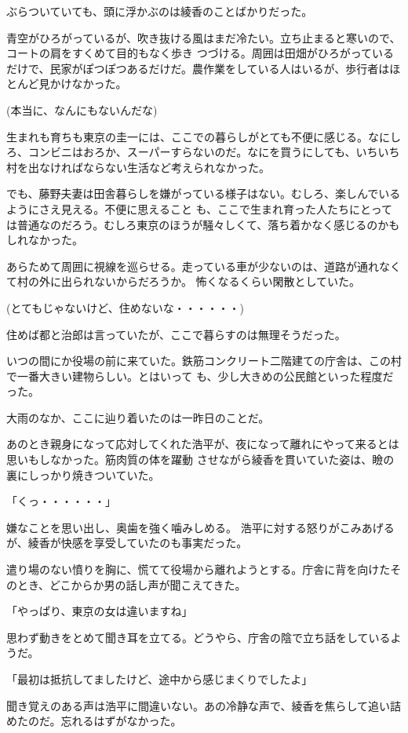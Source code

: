 ﻿\documentclass[book,tate]{jlreq}
\begin{document}
ぶらついていても、頭に浮かぶのは綾香のことばかりだった。

青空がひろがっているが、吹き抜ける風はまだ冷たい。立ち止まると寒いので、コートの肩をすくめて目的もなく歩き つづける。周囲は田畑がひろがっているだけで、民家がぽつぽつあるだけだ。農作業をしている人はいるが、歩行者はほ とんど見かけなかった。

(本当に、なんにもないんだな)

生まれも育ちも東京の圭一には、ここでの暮らしがとても不便に感じる。なにしろ、コンビニはおろか、スーパーすらないのだ。なにを買うにしても、いちいち村を出なければならない生活など考えられなかった。

でも、藤野夫妻は田舎暮らしを嫌がっている様子はない。むしろ、楽しんでいるようにさえ見える。不便に思えること も、ここで生まれ育った人たちにとっては普通なのだろう。むしろ東京のほうが騒々しくて、落ち着かなく感じるのかも しれなかった。

あらためて周囲に視線を巡らせる。走っている車が少ないのは、道路が通れなくて村の外に出られないからだろうか。 怖くなるくらい閑散としていた。

(とてもじゃないけど、住めないな・・・・・・)

住めば都と治郎は言っていたが、ここで暮らすのは無理そうだった。

いつの間にか役場の前に来ていた。鉄筋コンクリート二階建ての庁舎は、この村で一番大きい建物らしい。とはいって も、少し大きめの公民館といった程度だった。

大雨のなか、ここに辿り着いたのは一昨日のことだ。

あのとき親身になって応対してくれた浩平が、夜になって離れにやって来るとは思いもしなかった。筋肉質の体を躍動 させながら綾香を貫いていた姿は、瞼の裏にしっかり焼きついていた。

「くっ・・・・・・」

嫌なことを思い出し、奥歯を強く噛みしめる。 浩平に対する怒りがこみあげるが、綾香が快感を享受していたのも事実だった。

遣り場のない憤りを胸に、慌てて役場から離れようとする。庁舎に背を向けたそのとき、どこからか男の話し声が聞こえてきた。

「やっぱり、東京の女は違いますね」

思わず動きをとめて聞き耳を立てる。どうやら、庁舎の陰で立ち話をしているようだ。

「最初は抵抗してましたけど、途中から感じまくりでしたよ」

聞き覚えのある声は浩平に間違いない。あの冷静な声で、綾香を焦らして追い詰めたのだ。忘れるはずがなかった。
\end{document}
